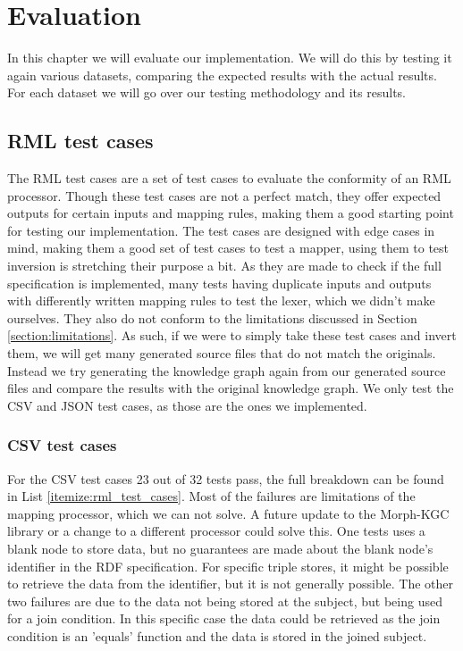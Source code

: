 \chapter{Evaluation}
\label{chapter:evaluation}
In this chapter we will evaluate our implementation. We will do this by testing it again various datasets, comparing the expected results with the actual results. For each dataset we will go over our testing methodology and its results.

\section{RML test cases}
\label{section:rml_test_cases}
The RML test cases \citep{rml-test-cases} are a set of test cases to evaluate the conformity of an RML processor. Though these test cases are not a perfect match, they offer expected outputs for certain inputs and mapping rules, making them a good starting point for testing our implementation. The test cases are designed with edge cases in mind, making them a good set of test cases to test a mapper, using them to test inversion is stretching their purpose a bit. As they are made to check if the full specification is implemented, many tests having duplicate inputs and outputs with differently written mapping rules to test the lexer, which we didn't make ourselves. They also do not conform to the limitations discussed in Section \ref{section:limitations}. As such, if we were to simply take these test cases and invert them, we will get many generated source files that do not match the originals. Instead we try generating the knowledge graph again from our generated source files and compare the results with the original knowledge graph. We only test the CSV and JSON test cases, as those are the ones we implemented. 

\subsection{CSV test cases}
For the CSV test cases 23 out of 32 tests pass, the full breakdown can be found in List \ref{itemize:rml_test_cases}. Most of the failures are limitations of the mapping processor, which we can not solve. A future update to the Morph-KGC library or a change to a different processor could solve this. One tests uses a blank node to store data, but no guarantees are made about the blank node's identifier in the RDF specification. For specific triple stores, it might be possible to retrieve the data from the identifier, but it is not generally possible. The other two failures are due to the data not being stored at the subject, but being used for a join condition. In this specific case the data could be retrieved as the join condition is an 'equals' function and the data is stored in the joined subject.

